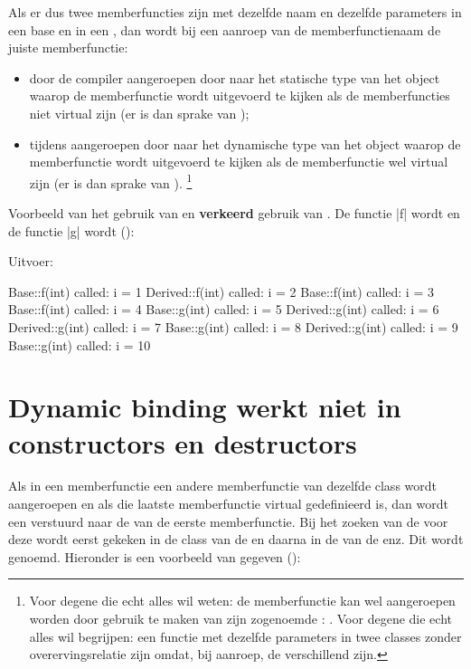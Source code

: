 \begin{cpplstShortInline}
Als er dus twee memberfuncties zijn met dezelfde naam en dezelfde parameters in een base en in een , dan wordt bij een aanroep van de memberfunctienaam de juiste memberfunctie:
\begin{itemize}
    \item door de compiler aangeroepen door naar het statische type van het object waarop de memberfunctie wordt uitgevoerd te kijken als de memberfuncties niet virtual zijn (er is dan sprake van );
    \item tijdens  aangeroepen door naar het dynamische type van het object waarop de memberfunctie wordt uitgevoerd te kijken als de memberfunctie wel virtual zijn (er is dan sprake van ).%
\footnote{%
    Voor degene die echt alles wil weten: de  memberfunctie kan wel aangeroepen worden door gebruik te maken van zijn zogenoemde : .
Voor degene die echt alles wil begrijpen: een functie met dezelfde parameters in twee classes zonder overervingsrelatie zijn  omdat, bij aanroep, de  verschillend zijn.
}
\end{itemize}

Voorbeeld van het gebruik van  en \textcolor{hrred}{\textbf{verkeerd}} gebruik van .
De functie |f| wordt  en de functie |g| wordt  ():

Uitvoer:
\begin{coutput}
Base::f(int) called: i = 1
Derived::f(int) called: i = 2
Base::f(int) called: i = 3
Base::f(int) called: i = 4
Base::g(int) called: i = 5
Derived::g(int) called: i = 6
Derived::g(int) called: i = 7
Base::g(int) called: i = 8
Derived::g(int) called: i = 9
Base::g(int) called: i = 10
\end{coutput}

\section{Dynamic binding werkt niet in constructors en destructors}
Als in een memberfunctie een andere memberfunctie van dezelfde class wordt aangeroepen en als die laatste memberfunctie virtual gedefinieerd is, dan wordt een  verstuurd naar de  van de eerste memberfunctie.
Bij het zoeken van de  voor deze  wordt eerst gekeken in de class van de  en daarna in de  van de  enz.
Dit wordt \emph{} genoemd.
Hieronder is een voorbeeld van  gegeven ():


\end{cpplstShortInline}
